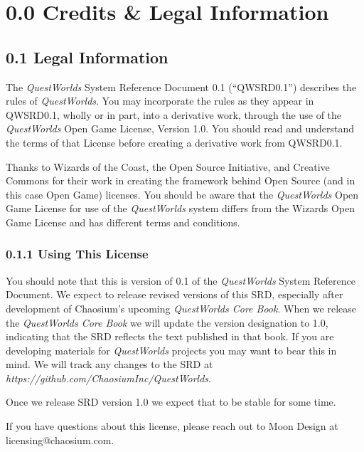 \documentclass[
]{article}
\author{}
\date{}
\begin{document}
{
\setcounter{tocdepth}{3}
\tableofcontents
}
\hypertarget{credits-legal-information}{%
\section{0.0 Credits \& Legal
Information}\label{credits-legal-information}}

\hypertarget{legal-information}{%
\subsection{0.1 Legal Information}\label{legal-information}}

The \emph{QuestWorlds} System Reference Document 0.1 (``QWSRD0.1'')
describes the rules of \emph{QuestWorlds}. You may incorporate the rules
as they appear in QWSRD0.1, wholly or in part, into a derivative work,
through the use of the \emph{QuestWorlds} Open Game License, Version
1.0. You should read and understand the terms of that License before
creating a derivative work from QWSRD0.1.

Thanks to Wizards of the Coast, the Open Source Initiative, and Creative
Commons for their work in creating the framework behind Open Source (and
in this case Open Game) licenses. You should be aware that the
\emph{QuestWorlds} Open Game License for use of the \emph{QuestWorlds}
system differs from the Wizards Open Game License and has different
terms and conditions.

\hypertarget{using-this-license}{%
\subsubsection{0.1.1 Using This License}\label{using-this-license}}

You should note that this is version of 0.1 of the \emph{QuestWorlds}
System Reference Document. We expect to release revised versions of this
SRD, especially after development of Chaosium's upcoming
\emph{QuestWorlds Core Book}. When we release the \emph{QuestWorlds Core
Book} we will update the version designation to 1.0, indicating that the
SRD reflects the text published in that book. If you are developing
materials for \emph{QuestWorlds} projects you may want to bear this in
mind. We will track any changes to the SRD at
\emph{https://github.com/ChaosiumInc/QuestWorlds}.

Once we release SRD version 1.0 we expect that to be stable for some
time.

If you have questions about this license, please reach out to Moon
Design at licensing@chaosium.com.
\end{document}
